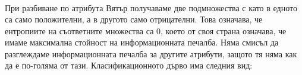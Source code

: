 \documentclass{article}
\begin{document}
\begin{enumerate}
\begin{gather}
\end{gather}
При разбиване по атрибута Вятър получаваме две подмножества с като в едното са само положителни, а в другото само отрицателни. Това означава, че ентропиите на съответните множества са 0, което от своя страна означава, че имаме максимална стойност на информационната печалба. Няма смисъл да разглеждаме информационната печалба за другите атрибути, защото тя няма как да е по-голяма от тази.
Класификационното дърво има следния вид:\\\\
\begin{minipage}[t]{\linewidth}
          \raggedright
\end{minipage}
\end{enumerate}
\end{document}
